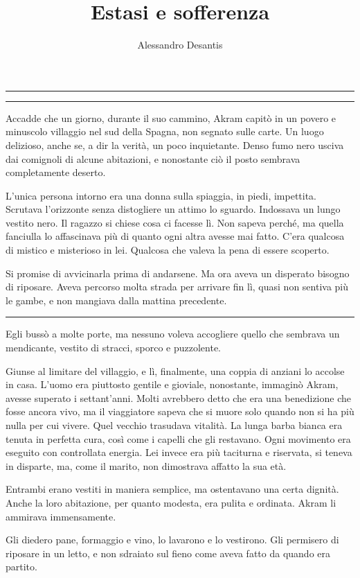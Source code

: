 \documentclass[a4paper,11pt,oneside,openright,final]{memoir}
\title{Estasi e sofferenza}
\author{Alessandro Desantis}
\makeatletter
\renewcommand{\maketitle}{\begin{titlingpage}%
    \let\footnotesize\small
    \let\footnoterule\relax
    \parindent \z@
    \reset@font
    \null\vfil
    \begin{flushleft}
      \huge \@title
    \end{flushleft}
    \par
    \hrule height 1pt
    \par
    \begin{flushright}
      \LARGE \@author \par
    \end{flushright}
    \vskip 60\p@
    \vfil\null
  \end{titlingpage}%
  \setcounter{footnote}{0}%
}
\makeatother
\begin{document}
\maketitle

\plainbreak{1}

Accadde che un giorno, durante il suo cammino, Akram capitò in un povero e
minuscolo villaggio nel sud della Spagna, non segnato sulle carte. Un luogo
delizioso, anche se, a dir la verità, un poco inquietante. Denso fumo nero
usciva dai comignoli di alcune abitazioni, e nonostante ciò il posto sembrava
completamente deserto.

L'unica persona intorno era una donna sulla spiaggia, in piedi, impettita.
Scrutava l'orizzonte senza distogliere un attimo lo sguardo. Indossava un lungo
vestito nero. Il ragazzo si chiese cosa ci facesse lì. Non sapeva perché, ma
quella fanciulla lo affascinava più di quanto ogni altra avesse mai fatto.
C'era qualcosa di mistico e misterioso in lei. Qualcosa che valeva la pena di
essere scoperto.

Si promise di avvicinarla prima di andarsene. Ma ora aveva un disperato bisogno
di riposare. Aveva percorso molta strada per arrivare fin lì, quasi non sentiva
più le gambe, e non mangiava dalla mattina precedente.

\plainbreak{1}

Egli bussò a molte porte, ma nessuno voleva accogliere quello che sembrava un
mendicante, vestito di stracci, sporco e puzzolente.

Giunse al limitare del villaggio, e lì, finalmente, una coppia di anziani lo
accolse in casa. L'uomo era piuttosto gentile e gioviale, nonostante, immaginò
Akram, avesse superato i settant'anni. Molti avrebbero detto che era una
benedizione che fosse ancora vivo, ma il viaggiatore sapeva che si muore solo
quando non si ha più nulla per cui vivere. Quel vecchio trasudava vitalità. La
lunga barba bianca era tenuta in perfetta cura, così come i capelli che gli
restavano. Ogni movimento era eseguito con controllata energia. Lei invece era
più taciturna e riservata, si teneva in disparte, ma, come il marito, non
dimostrava affatto la sua età.

Entrambi erano vestiti in maniera semplice, ma ostentavano una certa dignità.
Anche la loro abitazione, per quanto modesta, era pulita e ordinata. Akram li
ammirava immensamente.

Gli diedero pane, formaggio e vino, lo lavarono e lo vestirono. Gli permisero di
riposare in un letto, e non sdraiato sul fieno come aveva fatto da quando era
partito.
\end{document}
